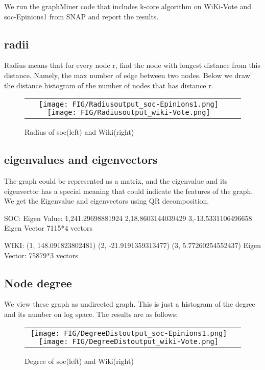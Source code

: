 We run the graphMiner code that includes k-core algorithm on WiKi-Vote and soc-Epinions1 from SNAP and report the results.

\subsection{radii}
Radius means that for every node r, find the node with longest distance from this distance. 
Namely, the max number of edge between two nodes.
Below we draw the distance histogram of the number of nodes that has distance r.

\begin{figure}[H]
\begin{center}
\begin{tabular}{cc}
     \texttt{[image: FIG/Radiusoutput\_soc-Epinions1.png]} 
     \texttt{[image: FIG/Radiusoutput\_wiki-Vote.png]} 
\end{tabular}
\caption{Radius of soc(left) and Wiki(right)}
\label{fig:results}
\end{center}
\end{figure}

\subsection{eigenvalues and eigenvectors}

The graph could be represented as a matrix, and the eigenvalue and its eigenvector has a special meaning that could indicate the features of the graph. We get the Eigenvalue and eigenvectors using QR decomposition.

SOC:
Eigen Value:
	1,241.29698881924
	2,18.8603144039429
	3,-13.5331106496658
Eigen Vector
	7115*4 vectors

WIKI:
	(1, 148.091823802481)
	(2, -21.9191359313477)
	(3, 5.77260254552437)
Eigen Vector:
	75879*3 vectors


\subsection{Node degree}

We view these graph as undirected graph. This is just a histogram of the degree and its number on log space. The results are as follows:

\begin{figure}[H]
\begin{center}
\begin{tabular}{cc}
     \texttt{[image: FIG/DegreeDistoutput\_soc-Epinions1.png]} 
     \texttt{[image: FIG/DegreeDistoutput\_wiki-Vote.png]} 
\end{tabular}
\caption{Degree of soc(left) and Wiki(right)}
\label{fig:results}
\end{center}
\end{figure}

